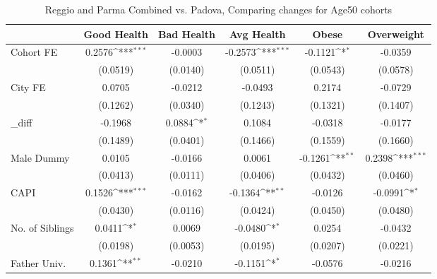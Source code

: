 \begin{table}[htbp]\centering
\def\sym#1{\ifmmode^{#1}\else\(^{#1}\)\fi}
\caption{Reggio and Parma Combined vs. Padova, Comparing changes for Age50 cohorts}
\begin{tabular}{l*{5}{c}}
\toprule
            &\multicolumn{1}{c}{Good Health}&\multicolumn{1}{c}{Bad Health}&\multicolumn{1}{c}{Avg Health}&\multicolumn{1}{c}{Obese}&\multicolumn{1}{c}{Overweight}\\
\midrule
Cohort FE   &      0.2576\sym{***}&     -0.0003         &     -0.2573\sym{***}&     -0.1121\sym{*}  &     -0.0359         \\
            &    (0.0519)         &    (0.0140)         &    (0.0511)         &    (0.0543)         &    (0.0578)         \\
\addlinespace
City FE     &      0.0705         &     -0.0212         &     -0.0493         &      0.2174         &     -0.0729         \\
            &    (0.1262)         &    (0.0340)         &    (0.1243)         &    (0.1321)         &    (0.1407)         \\
\addlinespace
\_diff       &     -0.1968         &      0.0884\sym{*}  &      0.1084         &     -0.0318         &     -0.0177         \\
            &    (0.1489)         &    (0.0401)         &    (0.1466)         &    (0.1559)         &    (0.1660)         \\
\addlinespace
Male Dummy  &      0.0105         &     -0.0166         &      0.0061         &     -0.1261\sym{**} &      0.2398\sym{***}\\
            &    (0.0413)         &    (0.0111)         &    (0.0406)         &    (0.0432)         &    (0.0460)         \\
\addlinespace
CAPI        &      0.1526\sym{***}&     -0.0162         &     -0.1364\sym{**} &     -0.0126         &     -0.0991\sym{*}  \\
            &    (0.0430)         &    (0.0116)         &    (0.0424)         &    (0.0450)         &    (0.0480)         \\
\addlinespace
No. of Siblings&      0.0411\sym{*}  &      0.0069         &     -0.0480\sym{*}  &      0.0254         &     -0.0432         \\
            &    (0.0198)         &    (0.0053)         &    (0.0195)         &    (0.0207)         &    (0.0221)         \\
\addlinespace
Father Univ.&      0.1361\sym{**} &     -0.0210         &     -0.1151\sym{*}  &     -0.0576         &     -0.0216         \\

\end{tabular}
\end{table}
